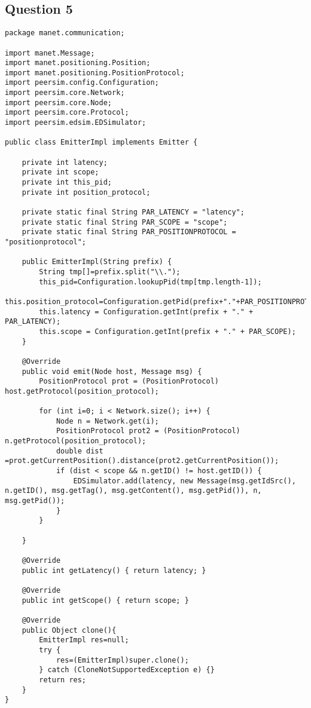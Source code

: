 \documentclass[a4paper]{article}
\begin{document}
\pagebreak
\subsection{Question 5}
\begin{verbatim}
package manet.communication;

import manet.Message;
import manet.positioning.Position;
import manet.positioning.PositionProtocol;
import peersim.config.Configuration;
import peersim.core.Network;
import peersim.core.Node;
import peersim.core.Protocol;
import peersim.edsim.EDSimulator;

public class EmitterImpl implements Emitter {

    private int latency;
    private int scope;
    private int this_pid;
    private int position_protocol;

    private static final String PAR_LATENCY = "latency";
    private static final String PAR_SCOPE = "scope";
    private static final String PAR_POSITIONPROTOCOL = "positionprotocol";

    public EmitterImpl(String prefix) {
        String tmp[]=prefix.split("\\.");
        this_pid=Configuration.lookupPid(tmp[tmp.length-1]);
        this.position_protocol=Configuration.getPid(prefix+"."+PAR_POSITIONPROTOCOL);
        this.latency = Configuration.getInt(prefix + "." + PAR_LATENCY);
        this.scope = Configuration.getInt(prefix + "." + PAR_SCOPE);
    }

    @Override
    public void emit(Node host, Message msg) {
        PositionProtocol prot = (PositionProtocol) host.getProtocol(position_protocol);

        for (int i=0; i < Network.size(); i++) {
            Node n = Network.get(i);
            PositionProtocol prot2 = (PositionProtocol) n.getProtocol(position_protocol);
            double dist =prot.getCurrentPosition().distance(prot2.getCurrentPosition());
            if (dist < scope && n.getID() != host.getID()) {
                EDSimulator.add(latency, new Message(msg.getIdSrc(), n.getID(), msg.getTag(), msg.getContent(), msg.getPid()), n, msg.getPid());
            }
        }

    }

    @Override
    public int getLatency() { return latency; }

    @Override
    public int getScope() { return scope; }

    @Override
    public Object clone(){
        EmitterImpl res=null;
        try {
            res=(EmitterImpl)super.clone();
        } catch (CloneNotSupportedException e) {}
        return res;
    }
}
\end{verbatim}
\end{document}
